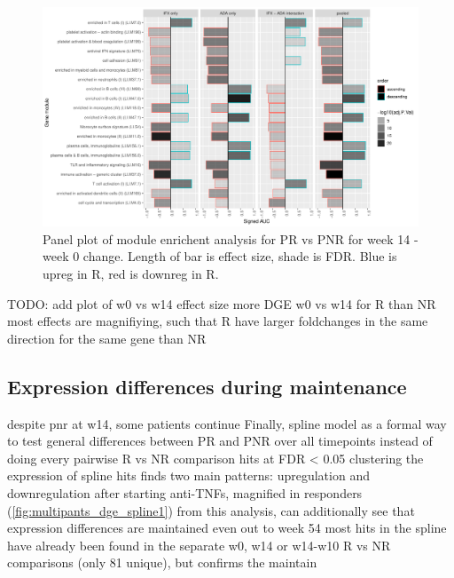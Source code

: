 \begin{outline}
\begin{figure}
    \centering
    \includegraphics[width=1.0\textwidth,page=1]{mainmatter/figures/chapter_04/plot_gene_set_enrichment.tmodCERNO_panelplot_C_(3RI_1RI)_(3NI_1NI),C_(3RA_1RA)_(3NA_1NA),C_((3RI_1RI)_(3NI_1NI))_((3RA_1RA)_(3NA_1NA)),C_(3R_1R)_(3N_1N).pdf}
    \caption{Panel plot of module enrichent analysis for PR vs PNR for week 14 - week 0 change. Length of bar is effect size, shade is FDR. Blue is upreg in R, red is downreg in R.}
    \label{fig:multipants_dge_panelPlot_week_14_0_R_N}
\end{figure}

\1 TODO: add plot of w0 vs w14 effect size
    \2 more DGE w0 vs w14 for R than NR
    \2 most effects are magnifiying, such that R have larger foldchanges in the same direction for the same gene than NR

\subsection{Expression differences during maintenance}

\1 despite pnr at w14, some patients continue
\1 Finally, spline model as a formal way to test general differences between PR and PNR over all timepoints
    \2 instead of doing every pairwise R vs NR comparison
     hits at FDR < 0.05
    \2 clustering the expression of spline hits finds two main patterns: upregulation and downregulation after starting anti-TNFs, magnified in responders (\autoref{fig:multipants_dge_spline1})
    \2 from this analysis, can additionally see that expression differences are maintained even out to week 54
    \2 most hits in the spline have already been found in the separate w0, w14 or w14-w10 R vs NR comparisons (only 81 unique), but confirms the maintain


\end{outline}

